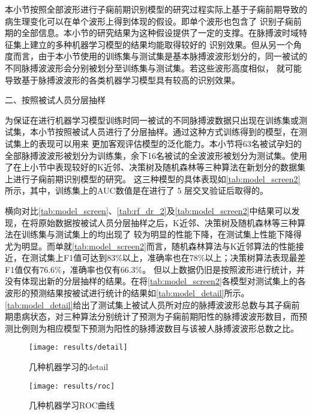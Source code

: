 本小节按照全部波形进行子痫前期识别模型的研究过程实际上基于子痫前期导致的病生理变化可以在单个波形上得到体现的假设。即单个波形也包含了
识别子痫前期的全部信息。本小节的研究结果为这种假设提供了一定的支撑。在脉搏波时域特征集上建立的多种机器学习模型的结果均能取得较好的
识别效果。但从另一个角度而言，由于本小节使用的训练集与测试集是基本脉搏波波形划分的，同一被试的不同脉搏波波形会分别被划分至训练集与测试集。若这些波形高度相似，
就可能导致基于脉搏波波形的各类机器学习模型具有较高的识别效果。

二、按照被试人员分层抽样

为保证在进行机器学习模型训练时同一被试的不同脉搏波数据只出现在训练集或测试集，本小节按照被试人员进行了分层抽样。通过这种方式训练得到的模型，在测试集上的表现可以用来
更加客观评估模型的泛化能力。本小节将63名被试孕妇的全部脉搏波波形被划分为训练集，余下16名被试的全波波形被划分为测试集。使用了在上小节中表现较好的K近邻、决策树及随机森林等三种算法在新划分的数据集上进行子痫前期识别模型的研究。
这三种模型的具体表现如\autoref{tab:model_screen2}所示，其中，训练集上的AUC数值是在进行了 5 层交叉验证后取得的。

横向对比\autoref{tab:model_screen}、\autoref{tab:rf_dr_2}及\autoref{tab:model_screen2}中结果可以发现，在将原始数据按被试人员分层抽样之后，K近邻、决策树及随机森林等三种算法在训练集与测试集上的均出现了
较为明显的性能下降，在测试集上性能下降得尤为明显。而单就\autoref{tab:model_screen2}而言，随机森林算法与K近邻算法的性能接近，在测试集上F1值可达到83\%以上，准确率也在78\%以上；决策树算法表现最差F1值仅有76.6\%，准确率也仅有66.3\%。
但以上数据仍旧是按照波形进行统计，并没有体现出新的分层抽样的结果。在将\autoref{tab:model_screen2}各模型对测试集上的各波形的预测结果按被试进行统计的结果如\autoref{tab:model_detail}所示。
\autoref{tab:model_detail}给出了测试集上被试人员所对应的脉搏波波形总数与其子痫前期患病状态，对三种算法分别统计了预测为子痫前期阳性的脉搏波波形数目，而预测比例则为相应模型下预测为阳性的脉搏波数目与该被人脉搏波波形总数之比。

\begin{figure}[htbp]
      \centering
      \texttt{[image: results/detail]}
      \caption[几种机器学习的detail]{\label{fig:model_detail}几种机器学习的detail}
\end{figure}
\begin{figure}[htbp]
      \centering
      \texttt{[image: results/roc]}
      \caption[几种机器学习ROC曲线]{\label{fig:model_roc}几种机器学习ROC曲线}
\end{figure}

